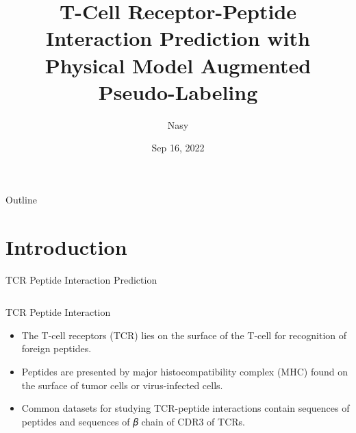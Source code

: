 \documentclass[aspectratio=1610,xcolor={dvipsnames},hyperref={colorlinks,unicode,linkcolor=violet,anchorcolor=blueviolet,citecolor=YellowOrange,filecolor=black,urlcolor=Aquamarine}]{beamer}
\author{Nasy}
\date{Sep 16, 2022}
\title{T-Cell Receptor-Peptide Interaction Prediction with Physical Model Augmented Pseudo-Labeling}
\begin{document}
\maketitle
\begin{frame}{Outline}
\tableofcontents
\end{frame}


\section{Introduction}
\label{sec:org262cdd8}

\begin{frame}[label={sec:org7383039}]{TCR Peptide Interaction Prediction}
\begin{columns}
\begin{column}{0.4\columnwidth}
\begin{block}{TCR Peptide Interaction}
\begin{itemize}
\item The T-cell receptors (TCR) lies on the surface of the T-cell for recognition of foreign peptides.
\item Peptides are presented by major histocompatibility complex (MHC) found on the surface of tumor cells or virus-infected cells.
\item Common datasets for studying TCR-peptide interactions contain sequences of peptides and sequences of 𝛽 chain of CDR3 of TCRs.
\end{itemize}
\end{block}
\end{column}


\end{columns}
\end{frame}
\end{document}
